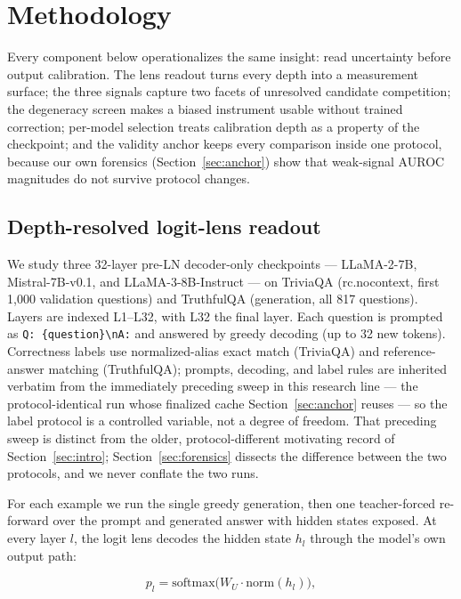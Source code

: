 \section{Methodology}
\label{sec:method}

Every component below operationalizes the same insight: read uncertainty before output calibration. The lens readout turns every depth into a measurement surface; the three signals capture two facets of unresolved candidate competition; the degeneracy screen makes a biased instrument usable without trained correction; per-model selection treats calibration depth as a property of the checkpoint; and the validity anchor keeps every comparison inside one protocol, because our own forensics (Section~\ref{sec:anchor}) show that weak-signal AUROC magnitudes do not survive protocol changes.

\subsection{Depth-resolved logit-lens readout}
\label{sec:readout}

We study three 32-layer pre-LN decoder-only checkpoints --- LLaMA-2-7B, Mistral-7B-v0.1, and LLaMA-3-8B-Instruct --- on TriviaQA (rc.nocontext, first 1,000 validation questions) and TruthfulQA (generation, all 817 questions). Layers are indexed L1--L32, with L32 the final layer. Each question is prompted as \texttt{Q: \{question\}\textbackslash nA:} and answered by greedy decoding (up to 32 new tokens). Correctness labels use normalized-alias exact match (TriviaQA) and reference-answer matching (TruthfulQA); prompts, decoding, and label rules are inherited verbatim from the immediately preceding sweep in this research line --- the protocol-identical run whose finalized cache Section~\ref{sec:anchor} reuses --- so the label protocol is a controlled variable, not a degree of freedom. That preceding sweep is distinct from the older, protocol-different motivating record of Section~\ref{sec:intro}; Section~\ref{sec:forensics} dissects the difference between the two protocols, and we never conflate the two runs.

For each example we run the single greedy generation, then one teacher-forced re-forward over the prompt and generated answer with hidden states exposed. At every layer $l$, the logit lens decodes the hidden state $h_l$ through the model's own output path:

\begin{equation}
p_l = \mathrm{softmax}\big(W_U \cdot \mathrm{norm}(h_l)\big),
\end{equation}

